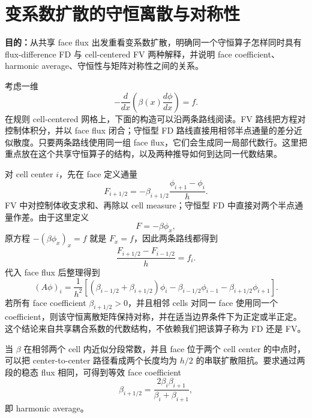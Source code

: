 \chapter{变系数扩散的守恒离散与对称性}
\label{app:variable-coeff}

\begin{keybox}
\textbf{目的：}从共享 face flux 出发重看变系数扩散，明确同一个守恒算子怎样同时具有 flux-difference FD 与 cell-centered FV 两种解释，并说明 face coefficient、harmonic average、守恒性与矩阵对称性之间的关系。
\end{keybox}


考虑一维
\begin{equation}
-\frac{d}{dx}\left(\beta(x)\frac{d\phi}{dx}\right)=f.
\end{equation}
在规则 cell-centered 网格上，下面的构造可以沿两条路线阅读。FV 路线把方程对控制体积分，并以 face flux 闭合；守恒型 FD 路线直接用相邻半点通量的差分近似散度。只要两条路线使用同一组 face flux，它们会生成同一局部代数行。这里把重点放在这个共享守恒算子的结构，以及两种推导如何到达同一代数结果。

对 cell center $i$，先在 face 定义通量
\begin{equation}
F_{i+1/2}
=-\beta_{i+1/2}\frac{\phi_{i+1}-\phi_i}{h}.
\end{equation}
FV 中对控制体收支求和、再除以 cell measure；守恒型 FD 中直接对两个半点通量作差。由于这里定义
\begin{equation}
F=-\beta\phi_x,
\end{equation}
原方程 $-(\beta\phi_x)_x=f$ 就是 $F_x=f$，因此两条路线都得到
\begin{equation}
\frac{F_{i+1/2}-F_{i-1/2}}{h}=f_i.
\label{eq:appb-flux-balance}
\end{equation}
代入 face flux 后整理得到
\begin{equation}
(A\phi)_i
=\frac{1}{h^2}
\left[
(\beta_{i-1/2}+\beta_{i+1/2})\phi_i
-\beta_{i-1/2}\phi_{i-1}
-\beta_{i+1/2}\phi_{i+1}
\right].
\end{equation}
若所有 face coefficient $\beta_{i+1/2}>0$，并且相邻 cells 对同一 face 使用同一个 coefficient，则该守恒离散矩阵保持对称，并在适当边界条件下为正定或半正定。这个结论来自共享耦合系数的代数结构，不依赖我们把该算子称为 FD 还是 FV。

当 $\beta$ 在相邻两个 cell 内近似分段常数，并且 face 位于两个 cell center 的中点时，可以把 center-to-center 路径看成两个长度均为 $h/2$ 的串联扩散阻抗。要求通过两段的稳态 flux 相同，可得到等效 face coefficient
\begin{equation}
\beta_{i+1/2}
=
\frac{2\beta_i\beta_{i+1}}
{\beta_i+\beta_{i+1}},
\end{equation}
即 harmonic average。

